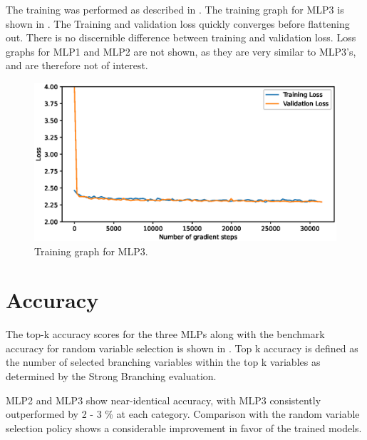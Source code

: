 The training was performed as described in . 
The training graph for MLP3 is shown in . The Training and validation loss quickly converges before flattening out. There is no discernible difference between training and validation loss. Loss graphs for MLP1 and MLP2 are not shown, as they are very similar to MLP3's, and are therefore not of interest. 
%
\begin{figure}[h]
    \centering
    \includegraphics[width=\textwidth]{img/loss70.eps}
    \caption{Training graph for MLP3.}
    \label{fig:training}
\end{figure}


\section{Accuracy}

The top-k accuracy scores for the three \gls{MLP}s along with the benchmark accuracy for random variable selection is shown in . Top k accuracy is defined as the number of selected branching variables within the top k variables as determined by the Strong Branching evaluation. 

MLP2 and MLP3 show near-identical accuracy, with MLP3 consistently outperformed by 2 - 3 \% at each category. Comparison with the random variable selection policy shows a considerable improvement in favor of the trained models. 

